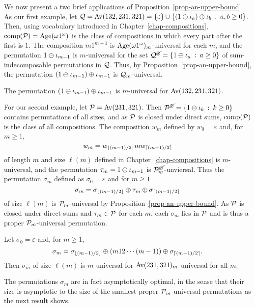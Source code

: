 We now present a two brief applications of Proposition~\ref{prop-an-upper-bound}. As our first example, let $\Q = \Av(132, 231, 321) = \{\varepsilon\} \cup \{(1 \skewsum \iota_a) \directsum \iota_b \st a, b \ge 0\}$. Then, using vocabulary introduced in Chapter~\ref{chap-compositions}, $\comp(\P) = \Age(\omega 1^\omega)$ is the class of compositions in which every part after the first is $1$. The composition $m 1^{m-1}$ is $\Age(\omega 1^\omega)_m$-universal for each $m$, and the permutation $1 \skewsum \iota_{m-1}$ is $m$-universal for the set $\Q^{\sumind} = \{1 \skewsum \iota_a \st a \ge 0\}$ of sum-indecomposable permutations in $\Q$. Thus, by Proposition~\ref{prop-an-upper-bound}, the permutation $(1 \skewsum \iota_{m-1}) \directsum \iota_{m-1}$ is $\Q_m$-universal.
\begin{proposition}
	The permutation $(1 \skewsum \iota_{m-1}) \directsum \iota_{m-1}$ is $m$-universal for $\Av(132, 231, 321)$.
\end{proposition}

For our second example, let $\P = \Av(231, 321)$. Then $\P^{\sumind} = \{1 \skewsum \iota_k \st k \ge 0\}$ contains permutations of all sizes, and as $\P$ is closed under direct sums, $\comp(\P)$ is the class of all compositions. The composition $w_m$ defined by $w_0 = \varepsilon$ and, for $m \ge 1$,
\[
	w_m
	=
	w_{\floor{(m-1)/2}} m w_{\ceil{(m-1)/2}}
\]
of length $m$ and size $\ell(m)$ defined in Chapter~\ref{chap-compositions} is $m$-universal, and the permutation $\tau_m = 1 \skewsum \iota_{m-1}$ is $\P^{\sumind}_m$-unviersal. Thus the permutation $\sigma_m$ defined as $\sigma_0 = \varepsilon$ and for $m \ge 1$
\[
	\sigma_m
	=
	\sigma_{\floor{(m-1)/2}}
	\directsum
	\tau_m
	\directsum
	\sigma_{\ceil{(m-1)/2}}
\]
of size $\ell(m)$ is $\P_m$-universal by Proposition~\ref{prop-an-upper-bound}. As $\P$ is closed under direct sums and $\tau_m \in \P$ for each $m$, each $\sigma_m$ lies in $\P$ and is thus a proper $\P_m$-universal permutation.
\begin{proposition}
\label{prop-perm-231-321-univ-proper}
	Let $\sigma_0 = \varepsilon$ and, for $m \ge 1$,
	\[
		\sigma_m
		=
		\sigma_{\floor{(m-1)/2}}
		\directsum
		(m 1 2 \cdots (m-1))
		\directsum
		\sigma_{\ceil{(m-1)/2}}.
	\]
	Then $\sigma_m$ of size $\ell(m)$ is $m$-universal for $\Av(231, 321)_m$-universal for all $m$.
\end{proposition}

The permutations $\sigma_m$ are in fact asymptotically optimal, in the sense that their size is asymptotic to the size of the smallest proper $\P_m$-universal permutations as the next result shows.

